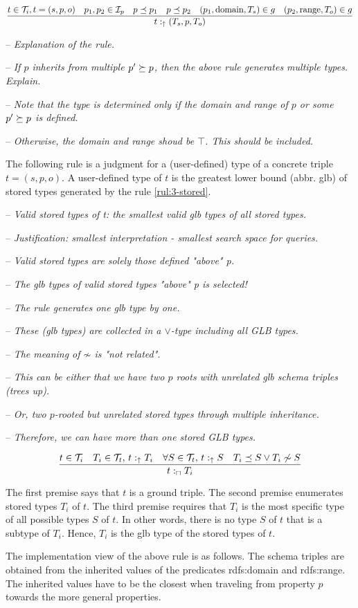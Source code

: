 \documentclass[runningheads]{llncs}
\newcommand{\uarr}{\uparrow}
\newcommand{\I}{{\cal I}}
\newcommand{\T}{{\cal T}}
\newcommand{\Ti}{{\cal T}_i}
\newcommand{\notes}[1]{\noindent\begin{small}-- \emph{#1}\\\end{small}}
\begin{document}
\begin{equation}
\label{rul:3-stored1}
\dfrac{t\in\Ti, t=(s,p,o)\quad p_1,p_2\in\I_p\quad p\preceq\/p_1\quad p\preceq\/p_2\quad (p_1,\text{domain},T_s)\in\/g
                \quad (p_2,\text{range},T_o)\in\/g}
      {t:_\uarr(T_s,p,T_o)}
\end{equation}

\notes{Explanation of the rule.}
\notes{If $p$ inherits from multiple $p'\succeq\/p$, then the above rule generates multiple types. Explain.}
\notes{Note that the type is determined only if the domain and range of $p$ or some $p'\succeq\/p$ is defined.}
\notes{Otherwise, the domain and range shoud be $\top$. This should be included.}

The following rule is a judgment for a (user-defined) type of a
concrete triple $t=(s,p,o)$. A user-defined type of $t$ is the
greatest lower bound (abbr. glb) of stored types generated by the rule
\ref{rul:3-stored}.

\medskip
\notes{Valid stored types of t: the smallest valid glb types of all stored types.}
\notes{Justification: smallest interpretation - smallest search space for queries.}
\notes{Valid stored types are solely those defined "above" p.}
\notes{The glb types of valid stored types "above" p is selected!}
\notes{The rule generates one glb type by one.}
\notes{These (glb types) are collected in a $\lor$-type including all GLB types.}

\notes{The meaning of $\not\sim$ is "\emph{not related}".}
\notes{This can be either that we have two $p$ roots with unrelated glb schema triples (trees up).}
\notes{Or, two $p$-rooted but unrelated stored types through multiple inheritance.}
\notes{Therefore, we can have more than one stored GLB types.}

\begin{equation}
\dfrac{t\in\T_i\quad T_i\in\T_t,\, t:_\uarr\/T_i\quad \forall\/S\in\T_t,\, t:_\uarr\/S\quad T_i\preceq\/S\lor\/T_i\not\sim\/S}
      {t:_\sqcap\/T_i}
\end{equation}

The first premise says that $t$ is a ground triple. The second premise
enumerates stored types $T_i$ of $t$. The third premise requires that
$T_i$ is the most specific type of all possible types $S$ of $t$. In
other words, there is no type $S$ of $t$ that is a subtype of
$T_i$. Hence, $T_i$ is the glb type of the stored types of $t$.

The implementation view of the above rule is as follows. The schema
triples are obtained from the inherited values of the predicates
rdfs:domain and rdfs:range. The inherited values have to be the
closest when traveling from property $p$ towards the more general
properties.
\end{document}
